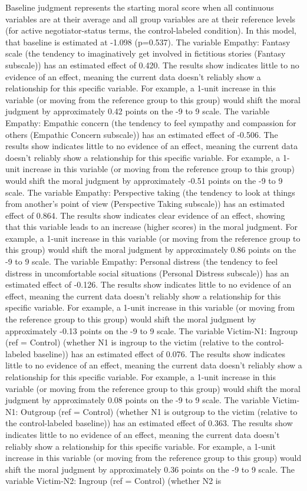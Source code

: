 \documentclass[11pt]{article}
\begin{document}
Baseline judgment represents the starting moral score when all continuous variables are at their average and all group variables are at their reference levels (for active negotiator-status terms, the control-labeled condition). In this model, that baseline is estimated at -1.098 (p=0.537). The variable Empathy: Fantasy scale (the tendency to imaginatively get involved in fictitious stories (Fantasy subscale)) has an estimated effect of 0.420. The results show indicates little to no evidence of an effect, meaning the current data doesn't reliably show a relationship for this specific variable. For example, a 1-unit increase in this variable (or moving from the reference group to this group) would shift the moral judgment by approximately 0.42 points on the -9 to 9 scale. The variable Empathy: Empathic concern (the tendency to feel sympathy and compassion for others (Empathic Concern subscale)) has an estimated effect of -0.506. The results show indicates little to no evidence of an effect, meaning the current data doesn't reliably show a relationship for this specific variable. For example, a 1-unit increase in this variable (or moving from the reference group to this group) would shift the moral judgment by approximately -0.51 points on the -9 to 9 scale. The variable Empathy: Perspective taking (the tendency to look at things from another's point of view (Perspective Taking subscale)) has an estimated effect of 0.864. The results show indicates clear evidence of an effect, showing that this variable leads to an increase (higher scores) in the moral judgment. For example, a 1-unit increase in this variable (or moving from the reference group to this group) would shift the moral judgment by approximately 0.86 points on the -9 to 9 scale. The variable Empathy: Personal distress (the tendency to feel distress in uncomfortable social situations (Personal Distress subscale)) has an estimated effect of -0.126. The results show indicates little to no evidence of an effect, meaning the current data doesn't reliably show a relationship for this specific variable. For example, a 1-unit increase in this variable (or moving from the reference group to this group) would shift the moral judgment by approximately -0.13 points on the -9 to 9 scale. The variable Victim-N1: Ingroup (ref = Control) (whether N1 is ingroup to the victim (relative to the control-labeled baseline)) has an estimated effect of 0.076. The results show indicates little to no evidence of an effect, meaning the current data doesn't reliably show a relationship for this specific variable. For example, a 1-unit increase in this variable (or moving from the reference group to this group) would shift the moral judgment by approximately 0.08 points on the -9 to 9 scale. The variable Victim-N1: Outgroup (ref = Control) (whether N1 is outgroup to the victim (relative to the control-labeled baseline)) has an estimated effect of 0.363. The results show indicates little to no evidence of an effect, meaning the current data doesn't reliably show a relationship for this specific variable. For example, a 1-unit increase in this variable (or moving from the reference group to this group) would shift the moral judgment by approximately 0.36 points on the -9 to 9 scale. The variable Victim-N2: Ingroup (ref = Control) (whether N2 is 
\end{document}
